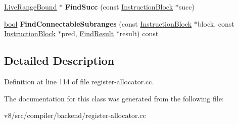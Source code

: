 \begin{DoxyCompactItemize}
\mbox{\hyperlink{classv8_1_1internal_1_1compiler_1_1LiveRangeBound}{Live\+Range\+Bound}} $\ast$ {\bfseries Find\+Succ} (const \mbox{\hyperlink{classv8_1_1internal_1_1compiler_1_1InstructionBlock}{Instruction\+Block}} $\ast$succ)
\item 
\mbox{\label{classv8_1_1internal_1_1compiler_1_1LiveRangeBoundArray_ac4c923eba4febc814261ef59dc437db9}} 
\mbox{\hyperlink{classbool}{bool}} {\bfseries Find\+Connectable\+Subranges} (const \mbox{\hyperlink{classv8_1_1internal_1_1compiler_1_1InstructionBlock}{Instruction\+Block}} $\ast$block, const \mbox{\hyperlink{classv8_1_1internal_1_1compiler_1_1InstructionBlock}{Instruction\+Block}} $\ast$pred, \mbox{\hyperlink{structv8_1_1internal_1_1compiler_1_1FindResult}{Find\+Result}} $\ast$result) const
\end{DoxyCompactItemize}


\subsection{Detailed Description}


Definition at line 114 of file register-\/allocator.\+cc.



The documentation for this class was generated from the following file\+:\begin{DoxyCompactItemize}
\item 
v8/src/compiler/backend/register-\/allocator.\+cc\end{DoxyCompactItemize}
